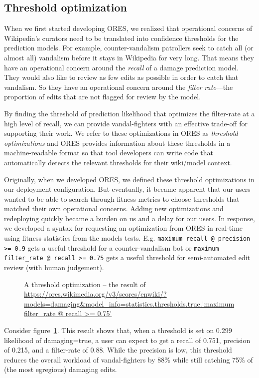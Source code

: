 \subsection{Threshold optimization}
\label{sec:appendix.threshold_optimization}
When we first started developing ORES, we realized that operational concerns of Wikipedia's curators need to be translated into confidence thresholds for the prediction models.  For example, counter-vandalism patrollers seek to catch all (or almost all) vandalism before it stays in Wikipedia for very long.  That means they have an operational concern around the \emph{recall} of a damage prediction model.  They would also like to review as few edits as possible in order to catch that vandalism.  So they have an operational concern around the \emph{filter rate}---the proportion of edits that are not flagged for review by the model\cite{halfaker2016notes}.

By finding the threshold of prediction likelihood that optimizes the filter-rate at a high level of recall, we can provide vandal-fighters with an effective trade-off for supporting their work.  We refer to these optimizations in ORES as \emph{threshold optimizations} and ORES provides information about these thresholds in a machine-readable format so that tool developers can write code that automatically detects the relevant thresholds for their wiki/model context.

Originally, when we developed ORES, we defined these threshold optimizations in our deployment configuration.  But eventually, it became apparent that our users wanted to be able to search through fitness metrics to choose thresholds that matched their own operational concerns.  Adding new optimizations and redeploying quickly became a burden on us and a delay for our users.  In response, we developed a syntax for requesting an optimization from ORES in real-time using fitness statistics from the models tests. E.g. \texttt{maximum recall @ precision >= 0.9} gets a useful threshold for a counter-vandalism bot or \texttt{maximum filter\_rate @ recall >= 0.75} gets a useful threshold for semi-automated edit review (with human judgement).

\begin{figure}[htbp]
        \caption{A threshold optimization -- the result of \url{https://ores.wikimedia.org/v3/scores/enwiki/?models=damaging&model_info=statistics.thresholds.true.'maximum filter_rate @ recall >= 0.75'}}
        \label{fig:english_damaging_threshold_optimization}
\end{figure}

Consider figure~\ref{fig:english_damaging_threshold_optimization}.  This result shows that, when a threshold is set on 0.299 likelihood of damaging=true, a user can expect to get a recall of 0.751, precision of 0.215, and a filter-rate of 0.88.  While the precision is low, this threshold reduces the overall workload of vandal-fighters by 88\% while still catching 75\% of (the most egregious) damaging edits.